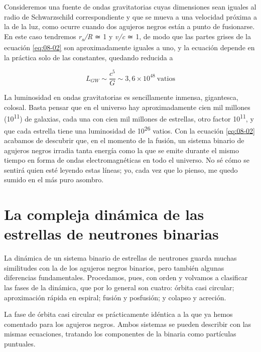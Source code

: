 Consideremos una fuente de ondas gravitatorias cuyas dimensiones sean iguales al radio de Schwarzschild correspondiente y que se mueva a una velocidad próxima a la de la luz, como ocurre cuando dos agujeros negros están a punto de fusionarse. En este caso tendremos \emph{r\textsubscript{s}/R} ≃ 1 y \emph{v/c} ≃ 1, de modo que las partes grises de la ecuación \eqref{eq:08-02} son aproximadamente iguales a uno, y la ecuación depende en la práctica solo de las constantes, quedando reducida a

\begin{equation}\label{eq:08-02}
L_{GW}\sim\frac{c^{5}}{G}\sim 3{,}6 \times 10^{48}\ \mathrm{vatios}
\end{equation}

La luminosidad en ondas gravitatorias es sencillamente inmensa, gigantesca, colosal. Basta pensar que en el universo hay aproximadamente cien mil millones (10\textsuperscript{11}) de galaxias, cada una con cien mil millones de estrellas, otro factor 10\textsuperscript{11}, y que cada estrella tiene una luminosidad de 10\textsuperscript{26} vatios. Con la ecuación \eqref{eq:08-02} acabamos de descubrir que, en el momento de la fusión, un sistema binario de agujeros negros irradia tanta energía como la que se emite durante el mismo tiempo en forma de ondas electromagnéticas en todo el universo. No sé cómo se sentirá quien esté leyendo estas líneas; yo, cada vez que lo pienso, me quedo sumido en el más puro asombro.

\section[Dinámica de las estrellas de neutrones binarias]{La compleja dinámica de las estrellas de neutrones binarias}\label{sec:08-neutron-stars}

La dinámica de un sistema binario de estrellas de neutrones guarda muchas similitudes con la de los agujeros negros binarios, pero también algunas diferencias fundamentales. Procedamos, pues, con orden y volvamos a clasificar las fases de la dinámica, que por lo general son cuatro: órbita casi circular; aproximación rápida en espiral; fusión y posfusión; y colapso y acreción.

La fase de órbita casi circular es prácticamente idéntica a la que ya hemos comentado para los agujeros negros. Ambos sistemas se pueden describir con las mismas ecuaciones, tratando los componentes de la binaria como partículas puntuales.

